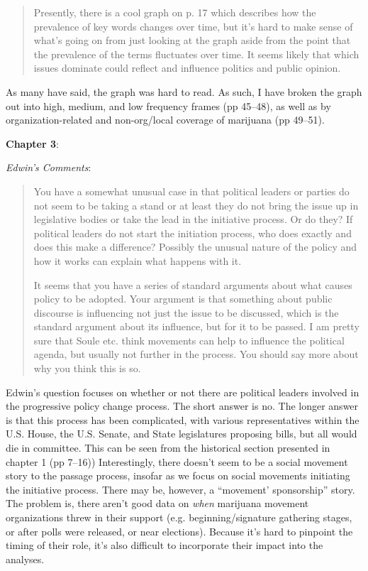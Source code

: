\documentclass[12pt,stdletter,dateno,sigleft]{newlfm} %
\begin{document}
\begin{newlfm}
\begin{quotation}{\color{red}\noindent \footnotesize
Presently, there is a cool graph on p. 17 which describes how the prevalence of key words changes over time, but it's hard to make sense of what's going on from just looking at the graph aside from the point that the prevalence of the terms fluctuates over time. It seems likely that which issues dominate could reflect and influence politics and public opinion.
}
\end{quotation}


As many have said, the graph was hard to read. As such, I have broken the graph out into high, medium, and low frequency frames (pp 45--48), as well as by organization-related and non-org/local coverage of marijuana (pp 49--51).\newline


\textbf{Chapter 3}: 

\textit{Edwin's Comments}:

\begin{quotation}{\color{red}\noindent \footnotesize
You have a somewhat unusual case in that political leaders or parties do not seem to be taking a stand or at least they do not bring the issue up in legislative bodies or take the lead in the initiative process. Or do they?  If political leaders do not start the initiation process, who does exactly and does this make a difference?  Possibly the unusual nature of the policy and how it works can explain what happens with it. \newline

\noindent It seems that you have a series of standard arguments about what causes policy to be adopted.   Your argument is that something about public discourse is influencing not just the issue to be discussed, which is the standard argument about its influence, but for it to be passed.  I am pretty sure that Soule etc. think movements can help to influence the political agenda, but usually not further in the process. You should say more about why you think this is so.  
}
\end{quotation}

Edwin's question focuses on whether or not there are political leaders involved in the progressive policy change process. The short answer is no. The longer answer is that this process has been complicated, with various representatives within the U.S. House, the U.S. Senate, and State legislatures proposing bills, but all would die in committee. This can be seen from the historical section presented in chapter 1 (pp 7--16)) Interestingly, there doesn't seem to be a social movement story to the passage process, insofar as we focus on social movements initiating the initiative process. There may be, however, a ``movement' sponsorship'' story. The problem is, there aren't good data on \textit{when} marijuana movement organizations threw in their support (e.g. beginning/signature gathering stages, or after polls were released, or near elections). Because it's hard to pinpoint the timing of their role, it's also difficult to incorporate their impact into the analyses.



\end{newlfm}
\end{document}
